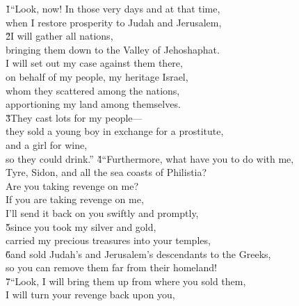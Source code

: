 \begin{poetry}
\poeml {}
\v{1}``Look, now! In those very days and at that time, \\
\poeml when I restore prosperity to Judah and Jerusalem, \\
\poeml \v{2}I will gather all nations, \\
\poemll    bringing them down to the Valley of Jehoshaphat. \\
\poeml I will set out my case against them there, \\
\poemll    on behalf of my people, my heritage Israel, \\
\poeml whom they scattered among the nations, \\
\poemll    apportioning my land among themselves. \\
\poeml \v{3}They cast lots for my people--- \\
\poemll    they sold a young boy in exchange for a prostitute, \\
\poeml and a girl for wine, \\
\poemll    so they could drink.''
\poeml \v{4}``Furthermore, what have you to do with me, \\
\poemll    Tyre, Sidon, and all the sea coasts of Philistia? \\
\poemlll       Are you taking revenge on me? \\
\poeml If you are taking revenge on me, \\
\poemll    I'll send it back on you swiftly and promptly, \\
\poeml \v{5}since you took my silver and gold, \\
\poemll    carried my precious treasures into your temples, \\
\poeml \v{6}and sold Judah's and Jerusalem's descendants to the Greeks, \\
\poemll    so you can remove them far from their homeland! \\
\poeml \v{7}``Look, I will bring them up from where you sold them, \\
\poemll    I will turn your revenge back upon you, \\

\end{poetry}
